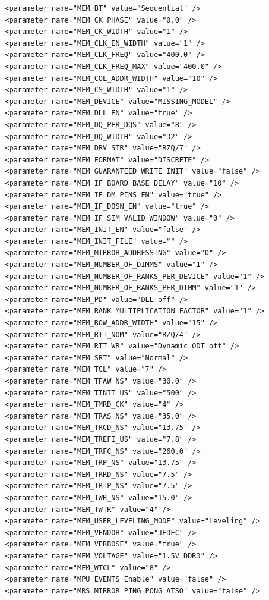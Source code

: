 \documentclass[conference]{IEEEtran}
\begin{document}
\begin{lstlisting}
  <parameter name="MEM_BT" value="Sequential" />
  <parameter name="MEM_CK_PHASE" value="0.0" />
  <parameter name="MEM_CK_WIDTH" value="1" />
  <parameter name="MEM_CLK_EN_WIDTH" value="1" />
  <parameter name="MEM_CLK_FREQ" value="400.0" />
  <parameter name="MEM_CLK_FREQ_MAX" value="400.0" />
  <parameter name="MEM_COL_ADDR_WIDTH" value="10" />
  <parameter name="MEM_CS_WIDTH" value="1" />
  <parameter name="MEM_DEVICE" value="MISSING_MODEL" />
  <parameter name="MEM_DLL_EN" value="true" />
  <parameter name="MEM_DQ_PER_DQS" value="8" />
  <parameter name="MEM_DQ_WIDTH" value="32" />
  <parameter name="MEM_DRV_STR" value="RZQ/7" />
  <parameter name="MEM_FORMAT" value="DISCRETE" />
  <parameter name="MEM_GUARANTEED_WRITE_INIT" value="false" />
  <parameter name="MEM_IF_BOARD_BASE_DELAY" value="10" />
  <parameter name="MEM_IF_DM_PINS_EN" value="true" />
  <parameter name="MEM_IF_DQSN_EN" value="true" />
  <parameter name="MEM_IF_SIM_VALID_WINDOW" value="0" />
  <parameter name="MEM_INIT_EN" value="false" />
  <parameter name="MEM_INIT_FILE" value="" />
  <parameter name="MEM_MIRROR_ADDRESSING" value="0" />
  <parameter name="MEM_NUMBER_OF_DIMMS" value="1" />
  <parameter name="MEM_NUMBER_OF_RANKS_PER_DEVICE" value="1" />
  <parameter name="MEM_NUMBER_OF_RANKS_PER_DIMM" value="1" />
  <parameter name="MEM_PD" value="DLL off" />
  <parameter name="MEM_RANK_MULTIPLICATION_FACTOR" value="1" />
  <parameter name="MEM_ROW_ADDR_WIDTH" value="15" />
  <parameter name="MEM_RTT_NOM" value="RZQ/4" />
  <parameter name="MEM_RTT_WR" value="Dynamic ODT off" />
  <parameter name="MEM_SRT" value="Normal" />
  <parameter name="MEM_TCL" value="7" />
  <parameter name="MEM_TFAW_NS" value="30.0" />
  <parameter name="MEM_TINIT_US" value="500" />
  <parameter name="MEM_TMRD_CK" value="4" />
  <parameter name="MEM_TRAS_NS" value="35.0" />
  <parameter name="MEM_TRCD_NS" value="13.75" />
  <parameter name="MEM_TREFI_US" value="7.8" />
  <parameter name="MEM_TRFC_NS" value="260.0" />
  <parameter name="MEM_TRP_NS" value="13.75" />
  <parameter name="MEM_TRRD_NS" value="7.5" />
  <parameter name="MEM_TRTP_NS" value="7.5" />
  <parameter name="MEM_TWR_NS" value="15.0" />
  <parameter name="MEM_TWTR" value="4" />
  <parameter name="MEM_USER_LEVELING_MODE" value="Leveling" />
  <parameter name="MEM_VENDOR" value="JEDEC" />
  <parameter name="MEM_VERBOSE" value="true" />
  <parameter name="MEM_VOLTAGE" value="1.5V DDR3" />
  <parameter name="MEM_WTCL" value="8" />
  <parameter name="MPU_EVENTS_Enable" value="false" />
  <parameter name="MRS_MIRROR_PING_PONG_ATSO" value="false" />

\end{lstlisting}
\end{document}
